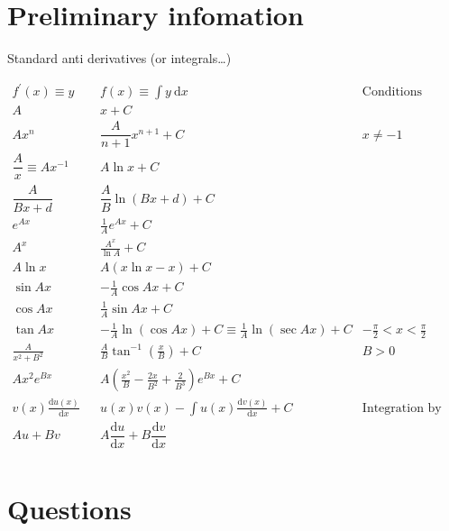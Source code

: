 \documentclass[
]{book}
\begin{document}
\hypertarget{sec:Prelim6}{%
\section{Preliminary infomation}\label{sec:Prelim6}}

Standard anti derivatives (or integrals\ldots)

\begin{equation*}
\begin{array}{cccc}
f^{\prime}(x) \equiv y & & f(x) \equiv \int y ~\textrm{d}x & \textrm{Conditions}\\
  \hline
  \hline
A & & x + C \\ 
Ax^n & & \dfrac{A}{n+1}x^{n+1}+ C & x \neq -1\\ 
\dfrac{A}{x} \equiv A x^{-1} & &  A \ln x + C\\  
\dfrac{A}{Bx+ d} & & \dfrac{A}{B} \ln(Bx + d) +C\\ 
e^{Ax} & &\frac{1}{A} e^{Ax} + C\\
A^x && \frac{A^x}{\ln A} +C\\
A \ln x & & A \left( x \ln x - x \right)+ C\\

\sin Ax & &-\frac{1}{A}\cos Ax + C\\ 
\cos Ax & &\frac{1}{A}\sin Ax + C\\
\tan Ax & &-\frac{1}{A}\ln(\cos Ax) + C \equiv \frac{1}{A}\ln(\sec Ax) + C & -\frac{\pi}{2} < x < \frac{\pi}{2}\\

\frac{A}{x^2 + B^2} && \frac{A}{B}\tan^{-1}\left(\frac{x}{B}\right) + C &B>0\\
Ax^2 e^{Bx} && A\left(\frac{x^2}{B} - \frac{2x}{B^2} + \frac{2}{B^3} \right)e^{Bx} +C\\

v(x) \frac{\textrm{d}u(x)}{\textrm{d}x} && u(x)v(x) - \int u(x)\frac{\textrm{d}v(x)}{\textrm{d}x} +C & \textrm{Integration by Parts}\\

Au + Bv & &A\dfrac{\textrm{d}u}{\textrm{d}x} + B\dfrac{\textrm{d}v}{\textrm{d}x} \\
\end{array}
\end{equation*}

\hypertarget{sec:Questions6}{%
\section{Questions}\label{sec:Questions6}}
\end{document}

